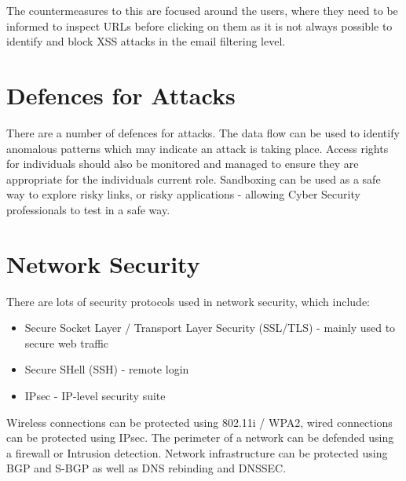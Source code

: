 The countermeasures to this are focused around the users, where they need to be informed to inspect URLs before clicking on them as it is not always possible to identify and block XSS attacks in the email filtering level. 

\section{Defences for Attacks}
There are a number of defences for attacks. The data flow can be used to identify anomalous patterns which may indicate an attack is taking place. Access rights for individuals should also be monitored and managed to ensure they are appropriate for the individuals current role. Sandboxing can be used as a safe way to explore risky links, or risky applications - allowing Cyber Security professionals to test in a safe way.

\section{Network Security}
There are lots of security protocols used in network security, which include:
\begin{itemize}
    \item Secure Socket Layer / Transport Layer Security (SSL/TLS) - mainly used to secure web traffic
    \item Secure SHell (SSH) - remote login
    \item IPsec - IP-level security suite
\end{itemize}

Wireless connections can be protected using 802.11i / WPA2, wired connections can be protected using IPsec. The perimeter of a network can be defended using a firewall or Intrusion detection. Network infrastructure can be protected using BGP and S-BGP as well as DNS rebinding and DNSSEC.